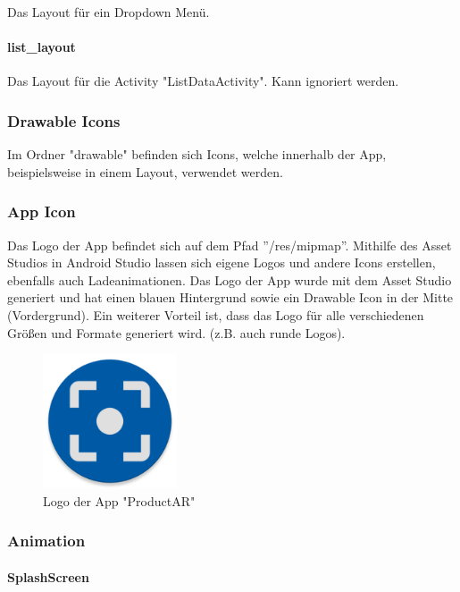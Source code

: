 \documentclass{scrartcl}
\begin{document}
\noindent Das Layout für ein Dropdown Menü. 

\paragraph{list\_layout} \mbox{} 

\noindent Das Layout für die Activity "ListDataActivity". Kann ignoriert werden.

\subsubsection{Drawable Icons}

Im Ordner "drawable" befinden sich Icons, welche innerhalb der App, beispielsweise in einem Layout, verwendet werden.

\newpage

\subsubsection{App Icon}

Das Logo der App befindet sich auf dem Pfad ''/res/mipmap''. Mithilfe des Asset Studios in Android Studio lassen sich eigene Logos und andere Icons erstellen, ebenfalls auch Ladeanimationen. Das Logo der App wurde mit dem Asset Studio generiert und hat einen blauen Hintergrund sowie ein Drawable Icon in der Mitte (Vordergrund). Ein weiterer Vorteil ist, dass das Logo für alle verschiedenen Größen und Formate generiert wird. (z.B. auch runde Logos).

\begin{figure}[h]
\centering
\includegraphics[width=150px]{img/app_icon.png}
\caption{Logo der App "ProductAR"}
\end{figure}

\subsubsection{Animation}

\paragraph{SplashScreen} \mbox{} \newline
\end{document}
